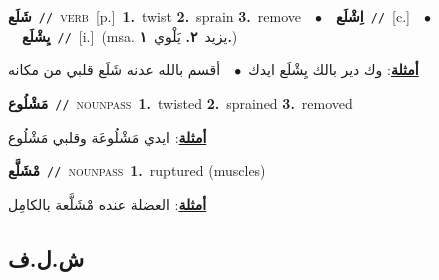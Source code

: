 \documentclass[10pt,a4paper,twoside]{article} %
\begin{document}
\begin{multicols}{2}
{\setlength\topsep{0pt}\textbf{\foreignlanguage{arabic}{شَلَع}}\ {\color{gray}\texttt{//}\color{black}}\ \textsc{verb}\ [p.]\ \textbf{1.}~twist  \textbf{2.}~sprain  \textbf{3.}~remove\ \ $\bullet$\ \ \setlength\topsep{0pt}\textbf{\foreignlanguage{arabic}{اِشْلَع}}\ {\color{gray}\texttt{//}\color{black}}\ [c.]\ \ $\bullet$\ \ \setlength\topsep{0pt}\textbf{\foreignlanguage{arabic}{يِشْلَع}}\ {\color{gray}\texttt{//}\color{black}}\ [i.]\ \color{gray}(msa. \foreignlanguage{arabic}{يزيد}~\foreignlanguage{arabic}{\textbf{٢.}}  \foreignlanguage{arabic}{يَلْوي}~\foreignlanguage{arabic}{\textbf{١.}})\color{black}\  \begin{flushright}\color{gray}\foreignlanguage{arabic}{\textbf{\underline{\foreignlanguage{arabic}{أمثلة}}}: وك دير بالك يِشْلَع ايدك\ $\bullet$\ \  أقسم بالله عدنه شَلَع قلبي من مكانه}\end{flushright}\color{black}} \vspace{2mm}

{\setlength\topsep{0pt}\textbf{\foreignlanguage{arabic}{مَشْلُوع}}\ {\color{gray}\texttt{//}\color{black}}\ \textsc{noun\textunderscore pass}\ \textbf{1.}~twisted  \textbf{2.}~sprained  \textbf{3.}~removed\  \begin{flushright}\color{gray}\foreignlanguage{arabic}{\textbf{\underline{\foreignlanguage{arabic}{أمثلة}}}: ايدي مَشْلُوعَة وقلبي مَشْلُوع}\end{flushright}\color{black}} \vspace{2mm}

{\setlength\topsep{0pt}\textbf{\foreignlanguage{arabic}{مْشَلَّع}}\ {\color{gray}\texttt{//}\color{black}}\ \textsc{noun\textunderscore pass}\ \textbf{1.}~ruptured (muscles)\  \begin{flushright}\color{gray}\foreignlanguage{arabic}{\textbf{\underline{\foreignlanguage{arabic}{أمثلة}}}: العضلة عنده مْشَلَّعة بالكامِل}\end{flushright}\color{black}} \vspace{2mm}

\vspace{-3mm}
\subsection*{\color{blue}\foreignlanguage{arabic}{ش.ل.ف}\color{blue}{}} 


\end{multicols}
\end{document}
